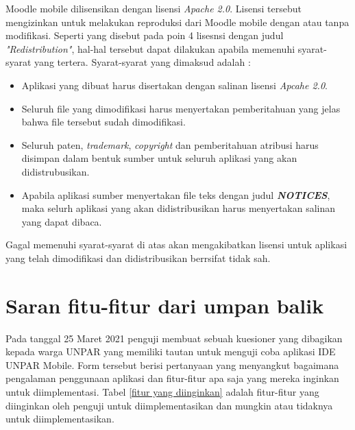 Moodle mobile dilisensikan dengan lisensi \textit{Apache 2.0}\cite{Moodlemobile:license}. Lisensi tersebut mengizinkan untuk melakukan reproduksi dari Moodle mobile dengan atau tanpa modifikasi. Seperti yang disebut pada poin 4 lisesnsi dengan judul \textit{"Redistribution"}, hal-hal tersebut dapat dilakukan apabila memenuhi syarat-syarat yang tertera. Syarat-syarat yang dimaksud adalah :
\begin{itemize}
\item Aplikasi yang dibuat harus disertakan dengan salinan lisensi \textit{Apcahe 2.0}.
\item Seluruh file yang dimodifikasi harus menyertakan pemberitahuan yang jelas bahwa file tersebut sudah dimodifikasi.
\item Seluruh paten, \textit{trademark}, \textit{copyright} dan pemberitahuan atribusi harus disimpan dalam bentuk sumber untuk seluruh aplikasi yang akan didistrubusikan.
\item Apabila aplikasi sumber menyertakan file teks dengan judul \textit{\textbf{NOTICES}}, maka selurh aplikasi yang akan didistribusikan harus menyertakan salinan yang dapat dibaca.
\end{itemize}
Gagal memenuhi syarat-syarat di atas akan mengakibatkan lisensi untuk aplikasi yang telah dimodifikasi dan didistribusikan berrsifat tidak sah.

\section{Saran fitu-fitur dari umpan balik}
\label{feature feedback}

Pada tanggal 25 Maret 2021 penguji membuat sebuah kuesioner yang dibagikan kepada warga UNPAR yang memiliki tautan untuk menguji coba aplikasi IDE UNPAR Mobile. Form tersebut berisi pertanyaan yang menyangkut bagaimana pengalaman penggunaan aplikasi dan fitur-fitur apa saja yang mereka inginkan untuk diimplementasi. Tabel \ref{fitur yang diinginkan} adalah fitur-fitur yang diinginkan oleh penguji untuk diimplementasikan dan mungkin atau tidaknya untuk diimplementasikan.

